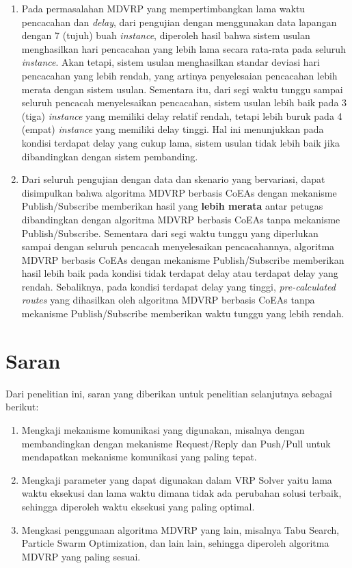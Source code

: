 \begin{enumerate}
	\item Pada permasalahan MDVRP yang mempertimbangkan lama waktu pencacahan dan \textit{delay}, dari pengujian dengan menggunakan data lapangan dengan 7 (tujuh) buah \textit{instance}, diperoleh hasil bahwa sistem usulan menghasilkan hari pencacahan yang lebih lama secara rata-rata pada seluruh \textit{instance}. Akan tetapi, sistem usulan menghasilkan standar deviasi hari pencacahan yang lebih rendah, yang artinya penyelesaian pencacahan lebih merata dengan sistem usulan. Sementara itu, dari segi waktu tunggu sampai seluruh pencacah menyelesaikan pencacahan, sistem usulan lebih baik pada 3 (tiga) \textit{instance} yang memiliki delay relatif rendah, tetapi lebih buruk pada 4 (empat) \textit{instance} yang memiliki delay tinggi. Hal ini menunjukkan pada kondisi terdapat delay yang cukup lama, sistem usulan tidak lebih baik jika dibandingkan dengan sistem pembanding.
	
	\item Dari seluruh pengujian dengan data dan skenario yang bervariasi, dapat disimpulkan bahwa algoritma MDVRP berbasis CoEAs dengan mekanisme Publish/Subscribe memberikan hasil yang \textbf{lebih merata} antar petugas dibandingkan dengan algoritma MDVRP berbasis CoEAs tanpa mekanisme Publish/Subscribe. Sementara dari segi waktu tunggu yang diperlukan sampai dengan seluruh pencacah menyelesaikan pencacahannya, algoritma MDVRP berbasis CoEAs dengan mekanisme Publish/Subscribe memberikan hasil lebih baik pada kondisi tidak terdapat delay atau terdapat delay yang rendah. Sebaliknya, pada kondisi terdapat delay yang tinggi, \textit{pre-calculated routes} yang dihasilkan oleh algoritma MDVRP berbasis CoEAs tanpa mekanisme Publish/Subscribe memberikan waktu tunggu yang lebih rendah.
\end{enumerate}


\section{Saran}
Dari penelitian ini, saran yang diberikan untuk penelitian selanjutnya sebagai berikut:

\begin{enumerate}
	\item Mengkaji mekanisme komunikasi yang digunakan, misalnya dengan membandingkan dengan mekanisme Request/Reply dan Push/Pull untuk mendapatkan mekanisme komunikasi yang paling tepat.
	\item Mengkaji parameter yang dapat digunakan dalam VRP Solver yaitu lama waktu eksekusi dan lama waktu dimana tidak ada perubahan solusi terbaik, sehingga diperoleh waktu eksekusi yang paling optimal.
	\item Mengkasi penggunaan algoritma MDVRP yang lain, misalnya Tabu Search, Particle Swarm Optimization, dan lain lain, sehingga diperoleh algoritma MDVRP yang paling sesuai.
\end{enumerate}

